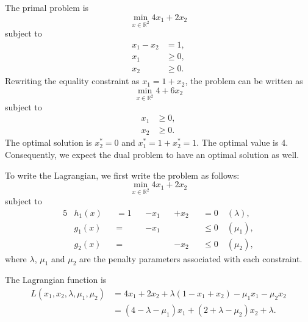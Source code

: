 


The primal problem is
$$\min_{x \in \mathbb{R}^2} 4x_1+2x_2$$ 
subject to 
\begin{align*}
x_1-x_2 & = 1,\\
x_1 & \geq 0,\\
x_2 & \geq 0.
\end{align*}
Rewriting the equality constraint as $x_1=1+x_2$, the problem can be
written as
\[
\min_{x \in \mathbb{R}^2} 4 + 6x_2
\]
subject to 
\begin{align*}
x_1 & \geq 0,\\
x_2 & \geq 0.
\end{align*}
The optimal solution is $x^*_2=0$ and $x^*_1 = 1+x_2^*=1$. The optimal
value is 4. Consequently, we expect the dual problem to have an
optimal solution as well. 

  To write the Lagrangian, we first write the problem as follows:
$$\min_{x \in \mathbb{R}^2} 4x_1+2x_2$$ 
subject to 
\begin{alignat*}{5}
& h_1(x) && = 1 && -x_1 && +x_2 && =0 \quad (\lambda),\\
& g_1(x) &&= && -x_1 && && \leq 0 \quad (\mu_1),\\
& g_2(x) &&= && && -x_2 && \leq 0 \quad (\mu_2),
\end{alignat*}
where $\lambda$, $\mu_1$ and $\mu_2$ are the penalty parameters
associated with each constraint.

The Lagrangian function is 
\begin{align*}
L(x_1,x_2,\lambda,\mu_1,\mu_2) & = 4x_1+2x_2 + \lambda(1-x_1+x_2) - \mu_1 x_1 - \mu_2 x_2\\
& = (4-\lambda-\mu_1)x_1 + (2+\lambda-\mu_2)x_2 + \lambda.
\end{align*}

